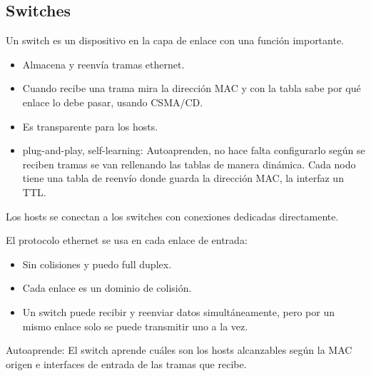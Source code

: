 \documentclass[12pt, twoside, openright]{report} %
\begin{document}
\subsection{Switches}

Un switch es un dispositivo en la capa de enlace con una función
importante.

\begin{itemize}
	\item Almacena y reenvía tramas ethernet.
	\item Cuando recibe una trama mira la dirección MAC y con la tabla
	      sabe por qué enlace lo debe pasar, usando CSMA/CD.
	\item Es transparente para los hosts.
	\item plug-and-play, self-learning: Autoaprenden, no hace falta
	      configurarlo según se reciben tramas se van rellenando las
	      tablas de manera dinámica. Cada nodo tiene una tabla de reenvío
	      donde guarda la dirección MAC, la interfaz un TTL.
\end{itemize}

Los hosts se conectan a los switches con conexiones dedicadas
directamente.

El protocolo ethernet se usa en cada enlace de entrada:

\begin{itemize}
	\item Sin colisiones y puedo full duplex.
	\item Cada enlace es un dominio de colisión.
	\item Un switch puede recibir y reenviar datos simultáneamente, pero
	      por un mismo enlace solo se puede transmitir uno a la vez.
\end{itemize}

Autoaprende: El switch aprende cuáles son los hosts alcanzables
según la MAC origen e interfaces de entrada de las tramas que
recibe.
\end{document}
